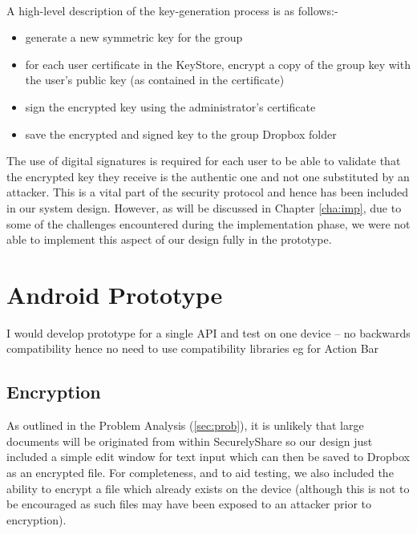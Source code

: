 \\

A high-level description of the key-generation process is as follows:-
\begin{itemize}
\item generate a new  symmetric key for the group
\item for each user certificate in the KeyStore, encrypt a copy of the group key with the user's public key (as contained in the certificate)
\item sign the encrypted key using the administrator's certificate
\item save the encrypted and signed key to the group Dropbox folder 
\end{itemize}

The use of digital signatures is required for each user to be able to validate that the encrypted key they receive is the authentic one and not one substituted by an attacker.  This  is a vital part of the  security protocol and hence has been included in our  system design.  However, as will be discussed in Chapter \ref{cha:imp}, due to some of the challenges encountered during the implementation phase, we were not able to implement this aspect of our design fully in the prototype.


\section{Android Prototype }

I would develop prototype for a single API and test on one device – no backwards compatibility hence no need to use compatibility libraries eg for Action Bar


\subsection*{Encryption }
As outlined in the Problem Analysis  (\ref{sec:prob}), it is unlikely that large documents will be originated from within SecurelyShare so our design just included a simple  edit window for text input which can then be saved to Dropbox as an encrypted file.  For completeness, and to aid testing, we also included the ability to encrypt a file which already exists on the device (although this is not to be encouraged as such files may have been exposed to an attacker prior to encryption).



